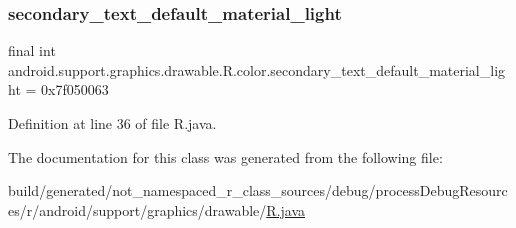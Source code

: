 \subsubsection{\texorpdfstring{secondary\_text\_default\_material\_light}{secondary\_text\_default\_material\_light}}
{\footnotesize\ttfamily final int android.\+support.\+graphics.\+drawable.\+R.\+color.\+secondary\+\_\+text\+\_\+default\+\_\+material\+\_\+light = 0x7f050063\hspace{0.3cm}{\ttfamily [static]}}



Definition at line 36 of file R.\+java.



The documentation for this class was generated from the following file\+:\begin{DoxyCompactItemize}
\item 
build/generated/not\+\_\+namespaced\+\_\+r\+\_\+class\+\_\+sources/debug/process\+Debug\+Resources/r/android/support/graphics/drawable/\mbox{\hyperlink{android_2support_2graphics_2drawable_2_r_8java}{R.\+java}}\end{DoxyCompactItemize}
